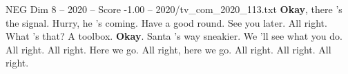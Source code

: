 \begin{textsample}{NEG Dim 8 – 2020 – Score -1.00 – 2020/tv\_com\_2020\_113.txt}  \label{ex:f8_neg_075}
\textbf{Okay}, there 's the signal.
Hurry, he 's coming.
Have a good round.
See you later.
All right.
What 's that?
A toolbox. \textbf{Okay}.
Santa 's way sneakier.
We 'll see what you do.
All right.
All right.
Here we go.
All right, here we go.
All right.
All right.
All right.

\end{textsample}
